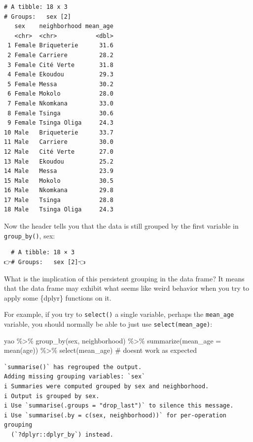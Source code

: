 \documentclass[
  letterpaper,
  DIV=11,
  numbers=noendperiod]{scrreprt}
\newenvironment{Shaded}{\begin{snugshade}}{\end{snugshade}}
\newcommand{\AttributeTok}[1]{\textcolor[rgb]{0.40,0.45,0.13}{#1}}
\newcommand{\CommentTok}[1]{\textcolor[rgb]{0.37,0.37,0.37}{#1}}
\newcommand{\FunctionTok}[1]{\textcolor[rgb]{0.28,0.35,0.67}{#1}}
\newcommand{\NormalTok}[1]{\textcolor[rgb]{0.00,0.23,0.31}{#1}}
\newcommand{\SpecialCharTok}[1]{\textcolor[rgb]{0.37,0.37,0.37}{#1}}
\begin{document}
\begin{verbatim}
# A tibble: 18 x 3
# Groups:   sex [2]
   sex    neighborhood mean_age
   <chr>  <chr>           <dbl>
 1 Female Briqueterie      31.6
 2 Female Carriere         28.2
 3 Female Cité Verte       31.8
 4 Female Ekoudou          29.3
 5 Female Messa            30.2
 6 Female Mokolo           28.0
 7 Female Nkomkana         33.0
 8 Female Tsinga           30.6
 9 Female Tsinga Oliga     24.3
10 Male   Briqueterie      33.7
11 Male   Carriere         30.0
12 Male   Cité Verte       27.0
13 Male   Ekoudou          25.2
14 Male   Messa            23.9
15 Male   Mokolo           30.5
16 Male   Nkomkana         29.8
17 Male   Tsinga           28.8
18 Male   Tsinga Oliga     24.3
\end{verbatim}

Now the header tells you that the data is still grouped by the first
variable in \texttt{group\_by()}, sex:

\begin{verbatim}
  # A tibble: 18 × 3
👉# Groups:   sex [2]👈
\end{verbatim}

What is the implication of this persistent grouping in the data frame?
It means that the data frame may exhibit what seems like weird behavior
when you try to apply some \{dplyr\} functions on it.

For example, if you try to \texttt{select()} a single variable, perhaps
the \texttt{mean\_age} variable, you should normally be able to just use
\texttt{select(mean\_age)}:

\begin{Shaded}
\begin{Highlighting}[]
\NormalTok{yao }\SpecialCharTok{\%\textgreater{}\%} 
  \FunctionTok{group\_by}\NormalTok{(sex, neighborhood) }\SpecialCharTok{\%\textgreater{}\%} 
  \FunctionTok{summarize}\NormalTok{(}\AttributeTok{mean\_age =} \FunctionTok{mean}\NormalTok{(age)) }\SpecialCharTok{\%\textgreater{}\%} 
  \FunctionTok{select}\NormalTok{(mean\_age) }\CommentTok{\# doesn\textquotesingle{}t work as expected }
\end{Highlighting}
\end{Shaded}

\begin{verbatim}
`summarise()` has regrouped the output.
Adding missing grouping variables: `sex`
i Summaries were computed grouped by sex and neighborhood.
i Output is grouped by sex.
i Use `summarise(.groups = "drop_last")` to silence this message.
i Use `summarise(.by = c(sex, neighborhood))` for per-operation grouping
  (`?dplyr::dplyr_by`) instead.
\end{verbatim}
\end{document}
